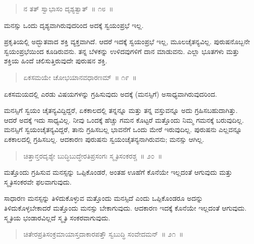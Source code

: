 \vspace{-0.3cm}

\begin{verse}
ನ ತತ್​ ಸ್ವಾಭಾಸಂ ದೃಶ್ಯತ್ವಾತ್​~॥ ೧೮~॥
\end{verse}

\vspace{-0.3cm}

ಮನಸ್ಸು ಒಂದು ದೃಶ್ಯವಾಗಿರುವುದರಿಂದ ಅದಕ್ಕೆ ಸ್ವಯಂಪ್ರಭೆ ಇಲ್ಲ. 

ಪ್ರಕೃತಿಯಲ್ಲಿ ಅದ್ಭುತವಾದ ಶಕ್ತಿ ವ್ಯಕ್ತವಾಗಿದೆ. ಆದರೆ ಇದಕ್ಕೆ ಸ್ವಯಂಪ್ರಭೆ ಇಲ್ಲ, ಮೂಲಚೈತನ್ಯವಿಲ್ಲ. ಪುರುಷನೊಬ್ಬನೇ ಸ್ವಯಂಪ್ರಭೆಯಿಂದ ಕೂಡಿರುವನು. ತನ್ನ ಬೆಳಕನ್ನು ಉಳಿದವುಗಳಿಗೆ ದಾನ ಮಾಡುವನು. ಎಲ್ಲಾ ಭೂತಗಳು ಮತ್ತು ಶಕ್ತಿಯ ಹಿಂದೆ ಚಲಿಸುತ್ತಿರುವುದೇ ಪುರುಷನ ಶಕ್ತಿ. 

\vspace{-0.3cm}

\begin{verse}
ಏಕಸಮಯೇ ಚೋಭಯಾನವಧಾರಣಮ್​~॥ ೧೯~॥
\end{verse}

\vspace{-0.3cm}

ಏಕಸಮಯದಲ್ಲಿ ಎರಡು ವಿಷಯಗಳನ್ನು ಗ್ರಹಿಸುವುದು ಅದಕ್ಕೆ (ಮನಸ್ಸಿಗೆ) ಅಸಾಧ್ಯವಾಗಿರುವುದರಿಂದ. 

ಮನಸ್ಸಿಗೆ ಸ್ವಯಂ ಚೈತನ್ಯವಿದ್ದಿದ್ದರೆ, ಏಕಕಾಲದಲ್ಲಿ ತನ್ನನ್ನೂ ಮತ್ತು ತನ್ನ ವಸ್ತುವನ್ನೂ ಅದು ಗ್ರಹಿಸಬಹುದಾಗಿತ್ತು. ಆದರೆ ಅದಕ್ಕೆ ಇದು ಸಾಧ್ಯವಿಲ್ಲ. ನೀವು ಒಂದಕ್ಕೆ ಹೆಚ್ಚು ಗಮನ ಕೊಟ್ಟರೆ ಮತ್ತೊಂದು ನಿಮ್ಮ ಗಮನಕ್ಕೆ ಬರುವುದಿಲ್ಲ. ಮನಸ್ಸಿಗೆ ಸ್ವಯಂಚೈತನ್ಯವಿದ್ದರೆ, ತಾನು ಗ್ರಹಿಸಬಲ್ಲ ಭಾವನೆಗೆ ಒಂದು ಮೇರೆ ಇರುವುದಿಲ್ಲ. ಪುರುಷನು ಎಲ್ಲವನ್ನೂ ಏಕಕಾಲದಲ್ಲಿ ಗ್ರಹಿಸಬಲ್ಲ. ಆದಕಾರಣ ಪುರುಷನು ಸ್ವಯಂಚೈತನ್ಯನಾಗಿರುವನು; ಮನಸ್ಸು ಆಗಿಲ್ಲ. 

\vspace{-0.3cm}

\begin{verse}
ಚಿತ್ತಾನ್ತರದೃಶ್ಯೇ ಬುದ್ಧಿಬುದ್ಧೇರತಿಪ್ರಸಂಗಃ ಸ್ಮೃತಿಸಂಕರಶ್ಚ~॥ ೨೦~॥
\end{verse}

\vspace{-0.3cm}

ಮತ್ತೊಂದು ಗ್ರಹಿಸುವ ಮನಸ್ಸನ್ನು ಒಪ್ಪಿಕೊಂಡರೆ, ಅಂತಹ ಊಹೆಗೆ ಕೊನೆಯೇ ಇಲ್ಲದಂತೆ ಆಗುವುದು ಮತ್ತು ಸ್ಮೃತಿಸಂಕರವೇ ಫಲವಾಗುವುದು. 

ಸಾಧಾರಣ ಮನಸ್ಸನ್ನು ತಿಳಿದುಕೊಳ್ಳುವ ಮತ್ತೊಂದು ಮನಸ್ಸಿದೆ ಎಂದು ಒಪ್ಪಿಕೊಂಡರೂ ಅದನ್ನು ತಿಳಿದುಕೊಳ್ಳಬೇಕಾದರೆ ಮತ್ತೊಂದು ಮನಸ್ಸು ಬೇಕಾಗುವುದು. ಆದಕಾರಣ ಇದಕ್ಕೆ ಕೊನೆಯೇ ಇಲ್ಲದಂತೆ ಆಗುವುದು. ಸ್ಮೃತಿಯ ಭಂಡಾರವಿಲ್ಲದೆ ಸ್ಮೃತಿ ಸಂಕರವಾಗುವುದು. 

\vspace{-0.3cm}

\begin{verse}
ಚಿತೇರಪ್ರತಿಸಂಕ್ರಮಾಯಾಸ್ತದಾಕಾರಪತ್ತೌ ಸ್ವಬುದ್ಧಿ ಸಂವೇದಮನ್​~॥ ೨೧~॥
\end{verse}

